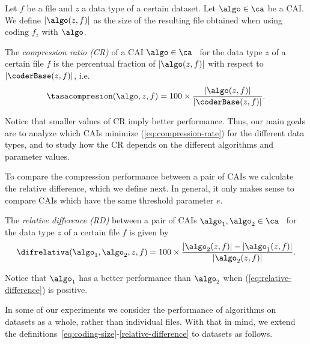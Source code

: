 \vspace{+2pt}
\begin{defcion}
\label{eq:coding-size}
Let $f$ be a file and $z$ a data type of a certain dataset. Let $\algo \in \ca$ be a CAI. We define $|\algo(z, f)|$ as the size of the resulting file obtained when using coding $f_z$ with $\algo$.
\end{defcion}


\vspace{+2pt}
\begin{defcion}
The \textit{compression ratio (CR)} of a CAI $\algo \in \ca$ \ for the data type $z$ of a certain file $f$ is the percentual fraction of $|\algo(z, f)|$ with respect to $|\coderBase(z, f)|$, i.e.
\vspace{-5pt}
\begin{equation}
\label{eq:compression-rate}
\tasacompresion(\algo, z, f) = 100\times\frac{|\algo(z, f)|}{|\coderBase(z, f)|}.
\end{equation}
\end{defcion}


Notice that smaller values of CR imply better performance. Thus, our main goals are to analyze which CAIs minimize (\ref{eq:compression-rate}) for the different data types, and to study how the CR depends on the different algorithms and parameter values.


To compare the compression performance between a pair of CAIs we calculate the relative difference, which we define next. In general, it only makes sense to compare CAIs which have the same threshold parameter $e$.


\vspace{+5pt}
\begin{defcion}
\label{relative-difference}
The \textit{relative difference (RD)} between a pair of CAIs $\algo_1, \algo_2 \in {\ca}$ \ for the data type $z$ of a certain file $f$ is given by
\vspace{-5pt}
\begin{equation}
\label{eq:relative-difference}
\difrelativa(\algo_1, \algo_2, z, f)  =
100\times\frac{|\algo_2 (z, f)| - |\algo_1 (z, f)|}{ |\algo_2 (z, f)| }.
\end{equation}
\end{defcion}


Notice that $\algo_1$ has a better performance than $\algo_2$ when (\ref{eq:relative-difference}) is positive.


\vspace{+3pt}
In some of our experiments we consider the performance of algorithms on datasets as a whole, rather than individual files. With that in mind, we extend the definitions~\ref{eq:coding-size}-\ref{relative-difference} to datasets as follows.


